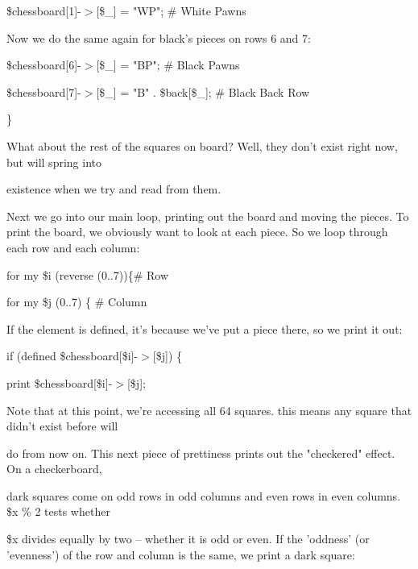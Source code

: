 \documentclass[a4paper,11pt]{book}
\begin{document}
\noindent 

\noindent \$chessboard[1]-$>$[\$\_] = "WP"; \# White Pawns

\noindent 

\noindent Now we do the same again for black's pieces on rows 6 and 7:

\noindent 

\noindent 

\noindent \$chessboard[6]-$>$[\$\_] = "BP"; \# Black Pawns

\noindent \$chessboard[7]-$>$[\$\_] = "B" . \$back[\$\_]; \# Black Back Row

\noindent \}

\noindent 

\noindent What about the rest of the squares on board? Well, they don't exist right now, but will spring into

\noindent existence when we try and read from them.

\noindent 

\noindent Next we go into our main loop, printing out the board and moving the pieces. To print the board, we obviously want to look at each piece. So we loop through each row and each column:

\noindent 

\noindent for my \$i (reverse (0..7))\{\# Row

\noindent for my \$j (0..7) \{ \# Column

\noindent 

\noindent If the element is defined, it's because we've put a piece there, so we print it out:

\noindent 

\noindent 

\noindent if (defined \$chessboard[\$i]-$>$[\$j]) \{

\noindent print \$chessboard[\$i]-$>$[\$j];

\noindent 

\noindent Note that at this point, we're accessing all 64 squares. this means any square that didn't exist before will

\noindent do from now on. This next piece of prettiness prints out the "checkered" effect. On a checkerboard,

\noindent dark squares come on odd rows in odd columns and even rows in even columns. \$x \% 2 tests whether

\noindent \$x divides equally by two -- whether it is odd or even. If the 'oddness' (or 'evenness') of the row and column is the same, we print a dark square:
\end{document}
